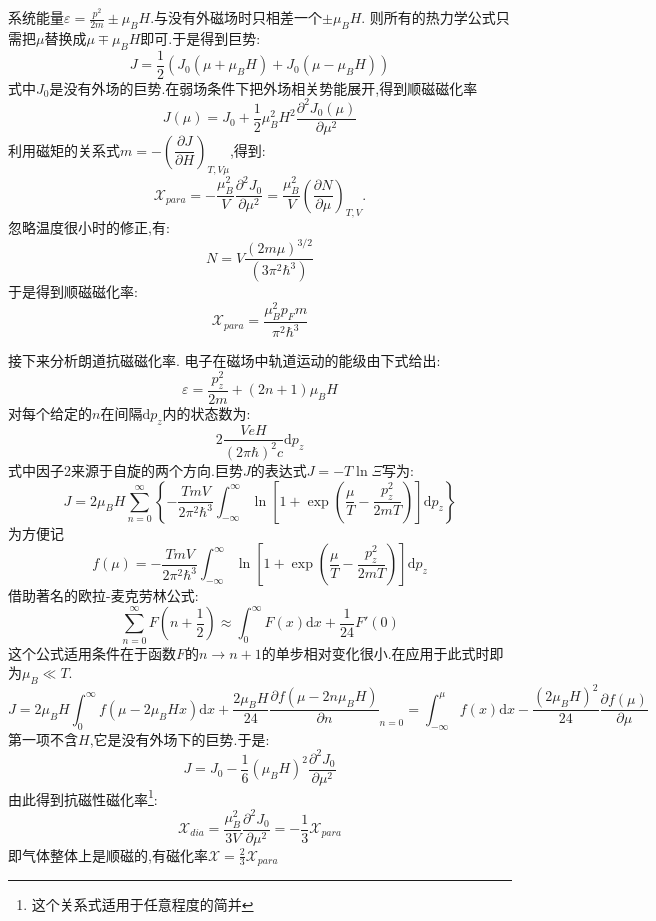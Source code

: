     系统能量$\varepsilon=\frac{p^{2}}{2m}\pm \mu_B H$.与没有外磁场时只相差一个$\pm \mu_B H$. 则所有的热力学公式只需把$\mu$替换成$\mu\mp \mu_BH$即可.于是得到巨势:
    \[J=\frac{1}{2}\left(J_0(\mu+\mu_BH)+J_0(\mu-\mu_BH)\right)\]
    式中$J_0$是没有外场的巨势.在弱场条件下把外场相关势能展开,得到顺磁磁化率
    \begin{equation}
      J(\mu)=J_0+\frac{1}{2}\mu_B^{2}H^{2}\frac{\partial^2 J_0(\mu)}{\partial \mu^2}
    \end{equation}
    利用磁矩的关系式$m=-\left( \dfrac{\partial J}{\partial H} \right) _{T,V\mu}$,得到:
    \begin{equation}
      \mathcal{X}_{para}=-\frac{\mu_B^{2}}{V}\frac{\partial^2 J_0}{\partial \mu^2}=\frac{\mu_B^{2}}{V}\left( \dfrac{\partial N}{\partial \mu} \right) _{T,V}.
    \end{equation}
    忽略温度很小时的修正,有:
    \[N=V\frac{(2m\mu)^{3 /2}}{(3\pi^{2}\hbar^{3})}\]
    于是得到顺磁磁化率:
    \begin{equation}
      \mathcal{X}_{para}=\frac{\mu_B^{2}p_Fm}{\pi^{2}\hbar^{3}}
    \end{equation}

    接下来分析朗道抗磁磁化率. 电子在磁场中轨道运动的能级由下式给出:
    \[\varepsilon=\frac{p_z^{2}}{2m}+(2n+1)\mu_BH\]
    对每个给定的$n$在间隔$\mathrm{d} p_z$内的状态数为:
    \[2\frac{Ve H}{(2\pi\hbar)^{2}c}\mathrm{d} p_z\]
    式中因子2来源于自旋的两个方向.巨势$J$的表达式$J=-T\ln\Xi$写为:
    \begin{equation}
      J=2\mu_BH\sum_{n=0}^{\infty}\left\{ -\frac{TmV}{2\pi^{2}\hbar^{3}}\int_{-\infty}^{\infty} \ln\left[ 1+\exp(\frac{\mu}{T}-\frac{p_z^{2}}{2mT}) \right]  \mathrm{d}p_z \right\} 
    \end{equation}
    为方便记\[f(\mu)=-\frac{TmV}{2\pi^{2}\hbar^{3}}\int_{-\infty}^{\infty} \ln\left[ 1+\exp(\frac{\mu}{T}-\frac{p_z^{2}}{2mT}) \right]  \mathrm{d}p_z\]
    借助著名的欧拉-麦克劳林公式:
    \begin{equation}
      \sum_{n=0}^{\infty}F(n+\frac{1}{2})\approx \int_{0}^{\infty} F(x) \mathrm{d}x+\frac{1}{24}F'(0)
    \end{equation}
    这个公式适用条件在于函数$F$的$n\to n+1$的单步相对变化很小.在应用于此式时即为$\mu_B\ll T$.
    \[J=2\mu
    _BH\int_{0}^{\infty} f(\mu-2\mu_BHx) \mathrm{d}x+\frac{2\mu_BH}{24}\dfrac{\partial f(\mu-2n\mu_BH)}{\partial n}_{n=0}=\int_{-\infty}^{\mu} f(x) \mathrm{d}x-\frac{(2\mu_BH)^{2}}{24}\dfrac{\partial f(\mu)}{\partial \mu}\]
    第一项不含$H$,它是没有外场下的巨势.于是:
    \begin{equation}
      J=J_0-\frac{1}{6}(\mu_BH)^{2}\frac{\partial^2 J_0}{\partial \mu^2}
    \end{equation}
    由此得到抗磁性磁化率\footnote{这个关系式适用于任意程度的简并}:
    \begin{equation}
      \mathcal{X}_{dia}=\frac{\mu_B^{2}}{3V}\frac{\partial^2 J_0}{\partial \mu^2}=-\frac{1}{3}\mathcal{X}_{para}
    \end{equation}
    即气体整体上是顺磁的,有磁化率$\mathcal{X}=\frac{2}{3}\mathcal{X}_{para}$

